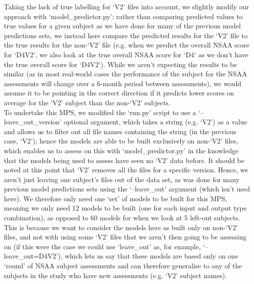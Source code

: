 \documentclass[12pt,twoside]{report}
\begin{document}
\quad Taking the lack of true labelling for ‘V2’ files into account, we slightly modify our approach with ‘model\_predictor.py’: rather than comparing predicted values to true values for a given subject as we have done for many of the previous model predictions sets, we instead here compare the predicted results for the ‘V2’ file to the true results for the non-‘V2’ file (e.g. when we predict the overall NSAA score for ‘D4V2’, we also look at the true overall NSAA score for ‘D4’ as we don’t have the true overall score for ‘D4V2’). While we aren’t expecting the results to be similar (as in most real-world cases the performance of the subject for the NSAA assessments will change over a 6-month period between assessments), we would assume it to be pointing in the correct direction if it predicts lower scores on average for the ‘V2’ subject than the non-‘V2’ subjects.\\

\quad To undertake this MPS, we modified the ‘rnn.py’ script to use a ‘--leave\_out\_version’ optional argument, which takes a string (e.g. ‘V2’) as a value and allows us to filter out all file names containing the string (in the previous case, ‘V2’); hence the models are able to be built exclusively on non-‘V2’ files, which enables us to assess on this with ‘model\_predictor.py’ in the knowledge that the models being used to assess have seen no ‘V2’ data before. It should be noted at this point that ‘V2’ removes all the files for a specific version. Hence, we aren’t just leaving one subject’s files out of the data set, as was done for many previous model predictions sets using the ‘--leave\_out’ argument (which isn’t used here). We therefore only need one ‘set’ of models to be built for this MPS, meaning we only need 12 models to be built (one for each input and output type combination), as opposed to 60 models for when we look at 5 left-out subjects. This is because we want to consider the models here as built only on non-‘V2’ files, and not with using some ‘V2’ files that we aren’t then going to be assessing on (if this were the case we could use ‘leave\_out’ as, for example, ‘--leave\_out=D4V2’), which lets us say that these models are based only on one ‘round’ of NSAA subject assessments and can therefore generalise to any of the subjects in the study who have new assessments (e.g. ‘V2’ subject names).\\
\end{document}
